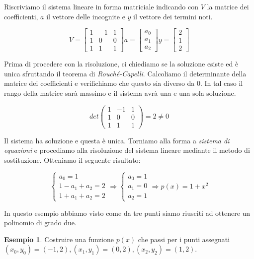 \documentclass{article}
\theoremstyle{plain}
\theoremstyle{plain}
\theoremstyle{definition}
\theoremstyle{definition}
\newtheorem{esempio}{Esempio}
\begin{document}
Riscriviamo il sistema lineare in forma matriciale indicando con $V$ la matrice dei coefficienti, $a$ il vettore delle incognite e $y$ il vettore dei termini noti.

\[
V=
\begin{bmatrix}
	1 & -1 & 1 \\
	1 & 0 & 0 \\
	1 & 1 & 1
\end{bmatrix}
a=
\begin{bmatrix}
	a_{0} \\
	a_{1} \\
	a_{2}
\end{bmatrix}
y=
\begin{bmatrix}
	2 \\
	1 \\
	2
\end{bmatrix}
\]

Prima di procedere con la risoluzione, ci chiediamo se la soluzione esiste ed è unica sfruttando il teorema di \emph{Rouché-Capelli}. Calcoliamo il determinante della matrice dei coefficienti e verifichiamo che questo sia diverso da 0. In tal caso il rango della matrice sarà massimo e il sistema avrà una e una sola soluzione.

\[
det
\begin{pmatrix}
	1 & -1 & 1 \\
	1 & 0 & 0 \\
	1 & 1 & 1
\end{pmatrix}
=2 \ne 0
\]

Il sistema ha soluzione e questa è unica. Torniamo alla forma a \emph{sistema di equazioni} e procediamo alla risoluzione del sistema lineare mediante il metodo di sostituzione. Otteniamo il seguente risultato:

\[
	\begin{cases}
		a_{0} = 1 \\
		1-a_{1}+a_{2}=2 \\
		1+a_{1}+a_{2}=2
	\end{cases}
	\Rightarrow
	\begin{cases}
		a_{0} = 1 \\
		a_{1}=0 \\
		a_{2}=1
	\end{cases}
	\Rightarrow
	p(x)=1+x^2
\]

In questo esempio abbiamo visto come da tre punti siamo riusciti ad ottenere un polinomio di grado due.

\begin{esempio}
	Costruire una funzione $p(x)$ che passi per i punti assegnati $(x_0, y_0)=(-1,2), (x_1, y_1)=(0,2), (x_2, y_2)=(1,2)$.
\end{esempio}
\end{document}
